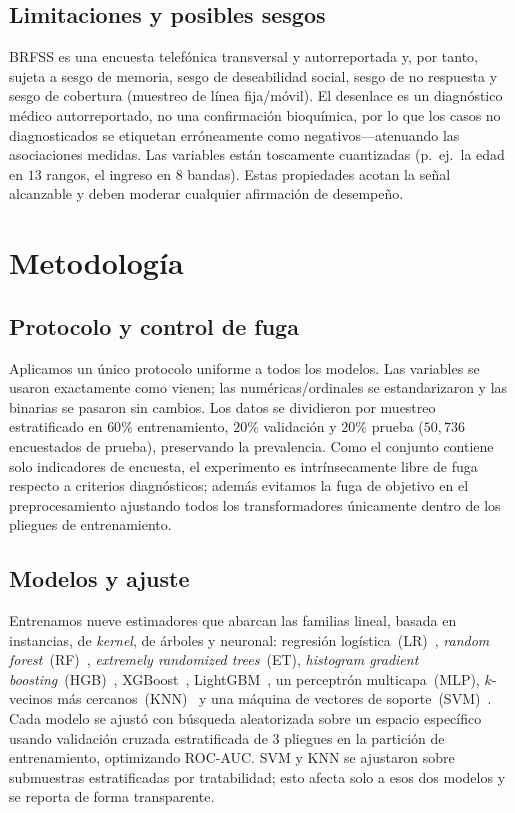 \documentclass[conference]{IEEEtran}
\begin{document}
\subsection{Limitaciones y posibles sesgos}
BRFSS es una encuesta telefónica transversal y autorreportada y, por tanto, sujeta a sesgo
de memoria, sesgo de deseabilidad social, sesgo de no respuesta y sesgo de cobertura
(muestreo de línea fija/móvil). El desenlace es un diagnóstico médico autorreportado, no una
confirmación bioquímica, por lo que los casos no diagnosticados se etiquetan erróneamente
como negativos---atenuando las asociaciones medidas. Las variables están toscamente
cuantizadas (p.\ ej.\ la edad en $13$ rangos, el ingreso en $8$ bandas). Estas propiedades
acotan la señal alcanzable y deben moderar cualquier afirmación de desempeño.

\section{Metodología}
\label{sec:methods}
\subsection{Protocolo y control de fuga}
Aplicamos un único protocolo uniforme a todos los modelos. Las variables se usaron
exactamente como vienen; las numéricas/ordinales se estandarizaron y las binarias se
pasaron sin cambios. Los datos se dividieron por muestreo estratificado en $60\%$
entrenamiento, $20\%$ validación y $20\%$ prueba ($50{,}736$ encuestados de prueba),
preservando la prevalencia. Como el conjunto contiene solo indicadores de encuesta, el
experimento es intrínsecamente libre de fuga respecto a criterios diagnósticos; además
evitamos la fuga de objetivo en el preprocesamiento ajustando todos los transformadores
únicamente dentro de los pliegues de entrenamiento.

\subsection{Modelos y ajuste}
Entrenamos nueve estimadores que abarcan las familias lineal, basada en instancias, de
\emph{kernel}, de árboles y neuronal: regresión logística~(LR)~\cite{pedregosa2011scikit},
\emph{random forest}~(RF)~\cite{breiman2001random}, \emph{extremely randomized
trees}~(ET), \emph{histogram gradient boosting}~(HGB)~\cite{friedman2001greedy},
XGBoost~\cite{chen2016xgboost}, LightGBM~\cite{ke2017lightgbm}, un perceptrón
multicapa~(MLP), $k$-vecinos más cercanos~(KNN)~\cite{cover1967knn} y una máquina de
vectores de soporte~(SVM)~\cite{cortes1995svm}. Cada modelo se ajustó con búsqueda
aleatorizada sobre un espacio específico usando validación cruzada estratificada de $3$
pliegues en la partición de entrenamiento, optimizando ROC-AUC. SVM y KNN se ajustaron sobre
submuestras estratificadas por tratabilidad; esto afecta solo a esos dos modelos y se
reporta de forma transparente.
\end{document}
